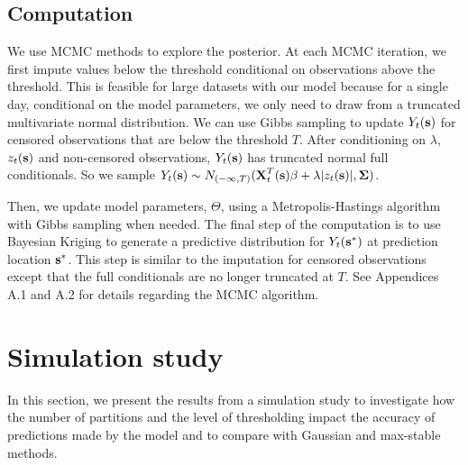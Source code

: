 \documentclass[useAMS,usenatbib,referee]{biom}
\providecommand{\DIFadd}[1]{{\protect\color{blue}\uwave{#1}}} %
\providecommand{\DIFdel}[1]{{\protect\color{red}\sout{#1}}}                      %
\providecommand{\DIFaddbegin}{} %
\providecommand{\DIFaddend}{} %
\providecommand{\DIFdelbegin}{} %
\providecommand{\DIFdelend}{} %
\begin{document}
\subsection{Computation}\label{s:comp}
We use MCMC methods to explore the posterior.
At each MCMC iteration, we first impute values below the threshold conditional on observations above the threshold.
This is feasible for large datasets with our model because for a single day, conditional on the model parameters, we only need to draw from a truncated multivariate normal distribution.
We can use Gibbs sampling to update $Y_t(\mbox{\bf s})$ for censored observations that are below the threshold $T$.
After conditioning on $\lambda$, $z_t(\mbox{\bf s})$ and non-censored observations, $Y_t(\mbox{\bf s})$ has truncated normal full conditionals.
So we sample \DIFdelbegin \DIFdel{$Y_t(\mbox{\bf s}) \sim N_{(-\infty, T)}(\mbox{\bf X}_t^T(\mbox{\bf s}) \beta + \lambda | z_t(\mbox{\bf s})|, \mbox{\boldmath $\Sigma$})$}\DIFdelend \DIFaddbegin \DIFadd{$Y_t(\bs) \sim N_{(-\infty, T)}(\bX_t^\prime(\bs) \beta + \lambda | z_t(\bs)|, \bSigma)$}\DIFaddend .

Then, we update model parameters, $\Theta$, using a Metropolis-Hastings algorithm with Gibbs sampling when needed.
The final step of the computation is to use Bayesian Kriging to generate a predictive distribution for $Y_t(\mbox{\bf s}^*)$ at prediction location $\mbox{\bf s}^*$.
This step is similar to the imputation for censored observations except that the full conditionals are no longer truncated at $T$.
See Appendices A.1 and A.2 for details regarding the MCMC algorithm.

\section{Simulation study}\label{s:simstudy}
In this section, we present the results from a simulation study to investigate how the number of partitions and the level of thresholding impact the accuracy of predictions made by the model and to compare with Gaussian and max-stable methods.
\end{document}
